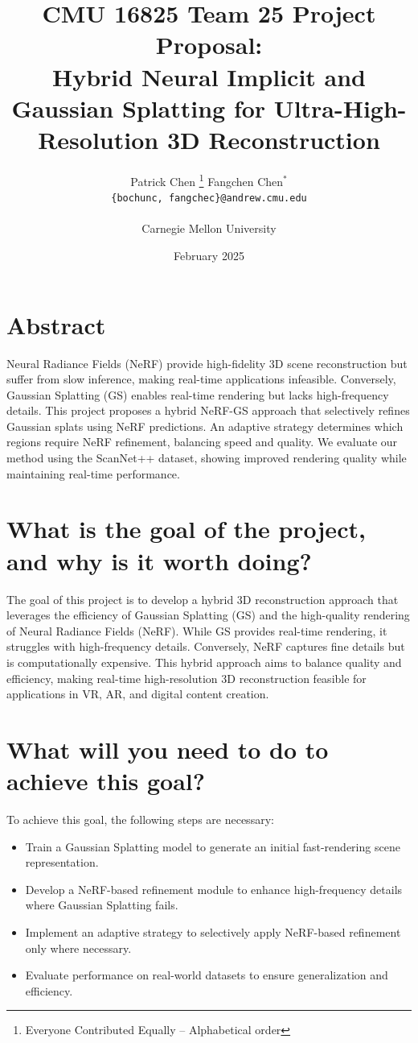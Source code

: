 \documentclass[10pt,letterpaper]{article}
\title{
	\Large{\textbf{CMU 16825 Team 25 Project Proposal: \\Hybrid Neural Implicit and Gaussian Splatting for Ultra-High-Resolution 3D Reconstruction}}
}
\date{February 2025}
\author{
	Patrick Chen \thanks{\hspace{4pt}Everyone Contributed Equally -- Alphabetical order} \hspace{2em} Fangchen Chen$^*$ \\
	\texttt{\{bochunc, fangchec\}@andrew.cmu.edu}	\\\\
	Carnegie Mellon University
}
\begin{document}
	
	\maketitle
	\thispagestyle{empty}
	\section*{\LARGE Abstract}
	\noindent Neural Radiance Fields (NeRF) provide high-fidelity 3D scene reconstruction but suffer from slow inference, making real-time applications infeasible. Conversely, Gaussian Splatting (GS) enables real-time rendering but lacks high-frequency details. This project proposes a hybrid NeRF-GS approach that selectively refines Gaussian splats using NeRF predictions. An adaptive strategy determines which regions require NeRF refinement, balancing speed and quality. We evaluate our method using the ScanNet++ dataset, showing improved rendering quality while maintaining real-time performance.
	
	
	\section{What is the goal of the project, and why is it worth doing?}
	The goal of this project is to develop a hybrid 3D reconstruction approach that leverages the efficiency of Gaussian Splatting (GS) and the high-quality rendering of Neural Radiance Fields (NeRF). While GS provides real-time rendering, it struggles with high-frequency details. Conversely, NeRF captures fine details but is computationally expensive. This hybrid approach aims to balance quality and efficiency, making real-time high-resolution 3D reconstruction feasible for applications in VR, AR, and digital content creation.
	
	\section{What will you need to do to achieve this goal?}
	To achieve this goal, the following steps are necessary:
	\begin{itemize}
		\item Train a Gaussian Splatting model to generate an initial fast-rendering scene representation.
		\item Develop a NeRF-based refinement module to enhance high-frequency details where Gaussian Splatting fails.
		\item Implement an adaptive strategy to selectively apply NeRF-based refinement only where necessary.
		\item Evaluate performance on real-world datasets to ensure generalization and efficiency.
	\end{itemize}
	
\end{document}
